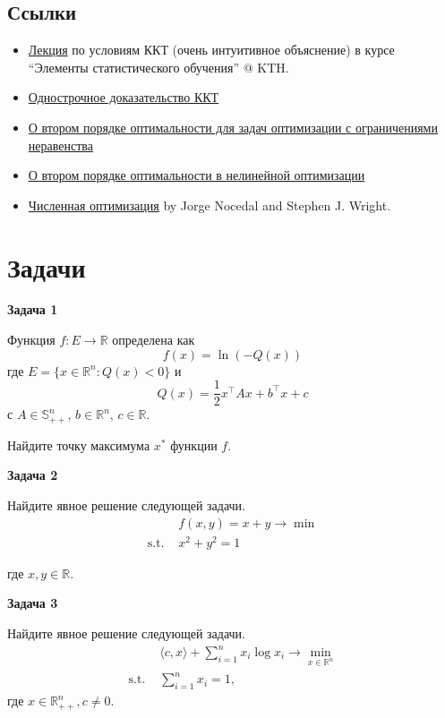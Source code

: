 \documentclass[
  russian,
  letterpaper,
  DIV=11,
  numbers=noendperiod]{scrartcl}
\providecommand{\tightlist}{%
  \setlength{\itemsep}{0pt}\setlength{\parskip}{0pt}}
\begin{document}
\subsection{Ссылки}\label{ux441ux441ux44bux43bux43aux438}

\begin{itemize}
\tightlist
\item
  \href{http://www.csc.kth.se/utbildning/kth/kurser/DD3364/Lectures/KKT.pdf}{Лекция}
  по условиям ККТ (очень интуитивное объяснение) в курсе ``Элементы
  статистического обучения'' @ KTH.
\item
  \href{https://link.springer.com/content/pdf/10.1007\%2Fs11590-008-0096-3.pdf}{Однострочное
  доказательство ККТ}
\item
  \href{https://www.scirp.org/pdf/OJOp_2013120315191950.pdf}{О втором
  порядке оптимальности для задач оптимизации с ограничениями
  неравенства}
\item
  \href{https://www.ime.usp.br/~ghaeser/secondorder.pdf}{О втором
  порядке оптимальности в нелинейной оптимизации}
\item
  \href{https://www.math.uci.edu/~qnie/Publications/NumericalOptimization.pdf}{Численная
  оптимизация} by Jorge Nocedal and Stephen J. Wright.
\end{itemize}

\section{Задачи}\label{ux437ux430ux434ux430ux447ux438}

\textbf{Задача 1}

Функция \(f: E \to \mathbb{R}\) определена как
\[f(x) = \ln \left( -Q(x) \right)\] где
\(E = \{x \in \mathbb{R}^n : Q(x) < 0\}\) и
\[Q(x) = \frac{1}{2} x^\top A x + b^\top x + c\] с
\(A \in \mathbb{S}^n_{++}, \, b \in \mathbb{R}^n, \, c \in \mathbb{R}\).

Найдите точку максимума \(x^*\) функции \(f\).

\textbf{Задача 2}

Найдите явное решение следующей задачи. \[
\begin{split}
& f(x, y) = x + y \to \min\\
\text{s.t. } & x^2 + y^2 = 1
\end{split}
\]

где \(x, y \in \mathbb{R}\).

\textbf{Задача 3}

Найдите явное решение следующей задачи. \[
\begin{split}
& \langle c, x \rangle + \sum_{i=1}^n x_i \log x_i \to \min\limits_{x \in \mathbb{R}^n }\\
\text{s.t. } & \sum_{i=1}^n x_i = 1,
\end{split}
\] где \(x\in\mathbb{R}^n_{++},c\neq 0\).
\end{document}
